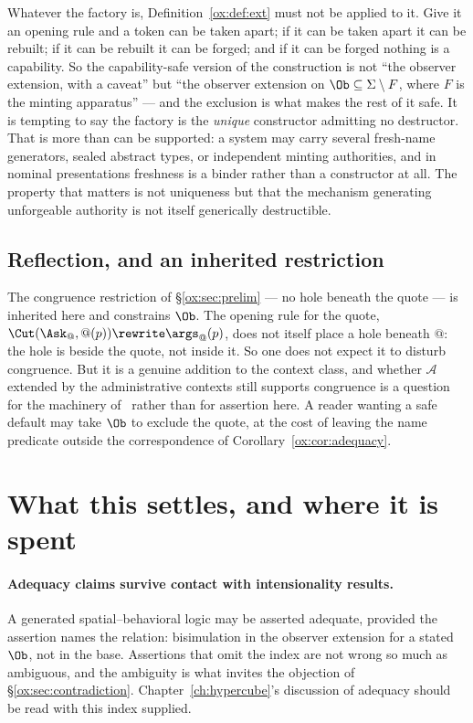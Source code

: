 \begin{remark}
\label{ox:rem:nodestructor}
Whatever the factory is, Definition~\ref{ox:def:ext} must not be applied to it.
Give it an opening rule and a token can be taken apart; if it can be taken apart it
can be rebuilt; if it can be rebuilt it can be forged; and if it can be forged
nothing is a capability. So the capability-safe version of the construction is not
``the observer extension, with a caveat'' but ``the observer extension on
$\Ob \subseteq \Sigma \setminus F$, where $F$ is the minting apparatus'' --- and the
exclusion is what makes the rest of it safe. It is tempting to say the factory is
the \emph{unique} constructor admitting no destructor. That is more than can be
supported: a system may carry several fresh-name generators, sealed abstract types,
or independent minting authorities, and in nominal presentations freshness is a
binder rather than a constructor at all. The property that matters is not
uniqueness but that the mechanism generating unforgeable authority is not itself
generically destructible.
\end{remark}

\subsection{Reflection, and an inherited restriction}

The congruence restriction of \S\ref{ox:sec:prelim} --- no hole beneath the quote
--- is inherited here and constrains $\Ob$. The opening rule for the quote,
$\Cut(\Ask_{@}, @(p)) \rewrite \args_{@}(p)$, does not itself place a hole beneath
$@$: the hole is beside the quote, not inside it. So one does not expect it to
disturb congruence. But it is a genuine addition to the context class, and whether
$\mathcal{A}$ extended by the administrative contexts still supports congruence is a
question for the machinery of~\cite{BIHOL} rather than for assertion here. A reader
wanting a safe default may take $\Ob$ to exclude the quote, at the cost of leaving
the name predicate outside the correspondence of
Corollary~\ref{ox:cor:adequacy}.

\section{What this settles, and where it is spent}
\label{ox:sec:settles}

\paragraph{Adequacy claims survive contact with intensionality results.}
A generated spatial--behavioral logic may be asserted adequate, provided the
assertion names the relation: bisimulation in the observer extension for a stated
$\Ob$, not in the base. Assertions that omit the index are not wrong so much as
ambiguous, and the ambiguity is what invites the objection of
\S\ref{ox:sec:contradiction}. Chapter~\ref{ch:hypercube}'s discussion of adequacy
should be read with this index supplied.

